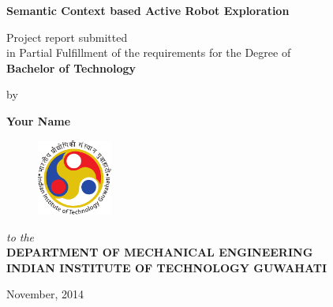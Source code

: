 \titlepage
\begin{center}
\LARGE{\bfseries  Semantic Context based Active Robot Exploration}

\onehalfspacing
\normalsize{ %
Project report submitted\\
in Partial Fulfillment of the requirements for the Degree of\\

\large{\bfseries {Bachelor of Technology}}\\
\vspace{1.25in}

by\\}

\vspace{0.35cm}


\Large{\bfseries Your Name}\\
\vspace{0.75in}
\begin{figure}[h]
\begin{center}
\includegraphics[height=2.5cm]{iitglogo}
\end{center}
\end{figure}
\normalsize{\emph{to the}\\} \vspace{0.25cm}
\normalsize{\bfseries DEPARTMENT OF MECHANICAL ENGINEERING}\\

\large{\bfseries INDIAN INSTITUTE OF TECHNOLOGY GUWAHATI}


November, 2014
\end{center}
